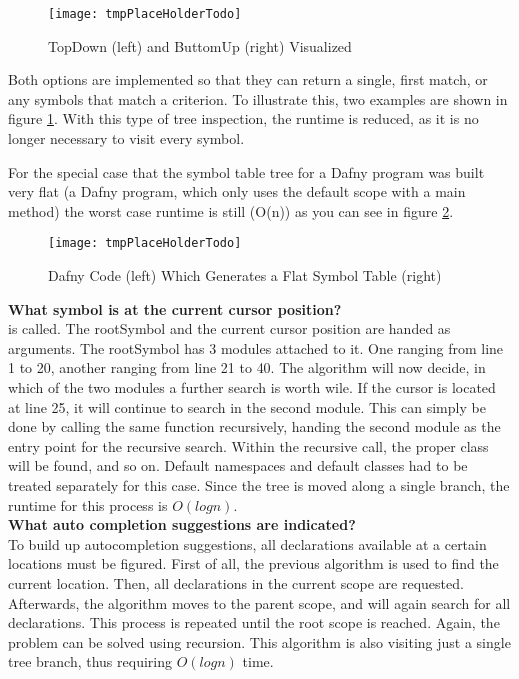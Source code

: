 \begin{figure}[H]
    \centering
    \texttt{[image: tmpPlaceHolderTodo]}
    \caption{TopDown (left) and ButtomUp (right) Visualized}
    \label{fig:impl_symboltablenav}
\end{figure}

Both options are implemented so that they can return a single, first match, or any symbols that match a criterion.
To illustrate this, two examples are shown in figure \ref{fig:impl_symboltablenav}.
With this type of tree inspection, the runtime is reduced, as it is no longer necessary to visit every symbol.

For the special case that the symbol table tree for a Dafny program was built very flat
(a Dafny program, which only uses the default scope with a main method)
the worst case runtime is still \code(O(n)) as you can see in figure \ref{fig:impl_symboltablenav_o_of_n}.

\begin{figure}[H]
    \centering
    \texttt{[image: tmpPlaceHolderTodo]}
    \caption{Dafny Code (left) Which Generates a Flat Symbol Table (right)}
    \label{fig:impl_symboltablenav_o_of_n}
\end{figure}

\textbf{What symbol is at the current cursor position?}\\
 is called.
The rootSymbol and the current cursor position are handed as arguments.
The rootSymbol has 3 modules attached to it.
One ranging from line 1 to 20, another ranging from line 21 to 40.
The algorithm will now decide, in which of the two modules a further search is worth wile.
If the cursor is located at line 25, it will continue to search in the second module.
This can simply be done by calling the same function recursively, handing the second module as the entry point for the recursive search.
Within the recursive call, the proper class will be found, and so on.
Default namespaces and default classes had to be treated separately for this case.
Since the tree is moved along a single branch, the runtime for this process is $O(logn)$.\\

\textbf{What auto completion suggestions are indicated?}\\
To build up autocompletion suggestions, all declarations available at a certain locations must be figured.
First of all, the previous  algorithm is used to find the current location.
Then, all declarations in the current scope are requested.
Afterwards, the algorithm moves to the parent scope, and will again search for all declarations.
This process is repeated until the root scope is reached.
Again, the problem can be solved using recursion.
This algorithm is also visiting just a single tree branch, thus requiring $O(logn)$ time.\\

